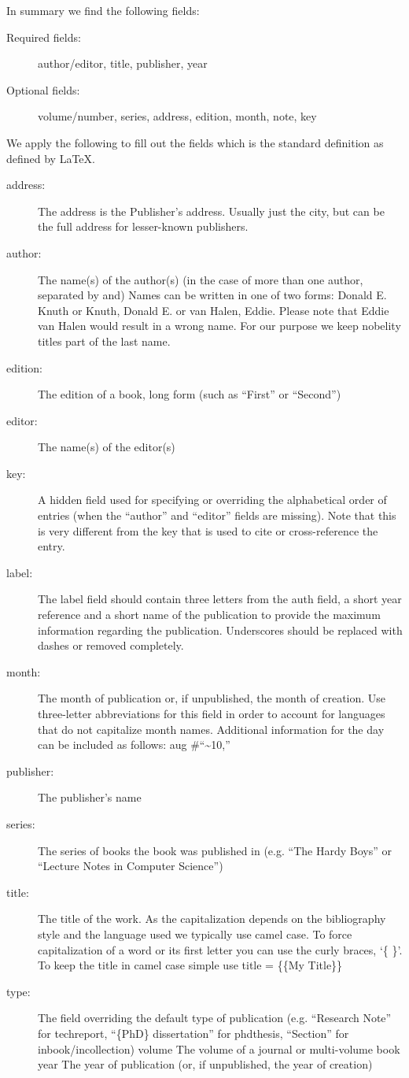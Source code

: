 In summary we find the following fields:

\begin{description}
\item[Required fields:]
author/editor, title, publisher, year
\item[Optional fields:]
volume/number, series, address, edition, month, note, key
\end{description}

We apply the following to fill out the fields which is the standard
definition as defined by \LaTeX.

\begin{description}
\item[address:]
The address is the Publisher's address. Usually just the city, but can
be the full address for lesser-known publishers.
\item[author:]
The name(s) of the author(s) (in the case of more than one author,
separated by and) Names can be written in one of two forms: Donald E.
Knuth or Knuth, Donald E. or van Halen, Eddie. Please note that Eddie
van Halen would result in a wrong name. For our purpose we keep nobelity
titles part of the last name.
\item[edition:]
The edition of a book, long form (such as ``First'' or ``Second'')
\item[editor:]
The name(s) of the editor(s)
\item[key:]
A hidden field used for specifying or overriding the alphabetical order
of entries (when the ``author'' and ``editor'' fields are missing). Note
that this is very different from the key that is used to cite or
cross-reference the entry.
\item[label:]
The label field should contain three letters from the auth field, a
short year reference and a short name of the publication to provide the
maximum information regarding the publication. Underscores should be
replaced with dashes or removed completely.
\item[month:]
The month of publication or, if unpublished, the month of creation. Use
three-letter abbreviations for this field in order to account for
languages that do not capitalize month names. Additional information for
the day can be included as follows: aug \#``\textasciitilde{}10,''
\item[publisher:]
The publisher's name
\item[series:]
The series of books the book was published in (e.g. ``The Hardy Boys''
or ``Lecture Notes in Computer Science'')
\item[title:]
The title of the work. As the capitalization depends on the bibliography
style and the language used we typically use camel case. To force
capitalization of a word or its first letter you can use the curly
braces, `\{ \}'. To keep the title in camel case simple use title =
\{\{My Title\}\}
\item[type:]
The field overriding the default type of publication (e.g. ``Research
Note'' for techreport, ``\{PhD\} dissertation'' for phdthesis,
``Section'' for inbook/incollection) volume The volume of a journal or
multi-volume book year The year of publication (or, if unpublished, the
year of creation)
\end{description}

